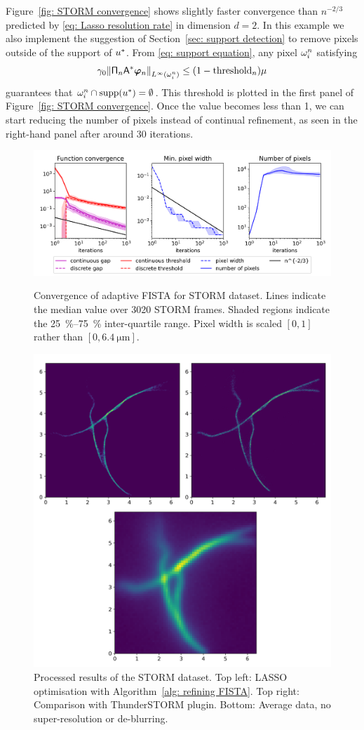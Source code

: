 \documentclass[smallextended]{svjour3}
\newcommand{\norm}[1]{{\left\lVert #1 \right\rVert}}
\newcommand{\op}[1]{\operatorname{#1}}
\newcommand{\1}{\F{1}}
\newcommand*{\varf}[1]{%
	\IfEqCase{#1}{%
		{0}{u}%
		{1}{v}%
		{2}{w}%
	}[u#1]%
}
\newcommand*{\vard}[1]{%
	\IfEqCase{#1}{%
		{0}{\varphi}%
		{1}{\psi}%
	}[\varphi #1]%
}
\newcommand*{\vars}[1]{%
	\IfEqCase{#1}{%
		{0}{\alpha}%
		{1}{\beta}%
		{2}{\gamma}%
		{3}{a}%
		{4}{b}%
		{5}{c}%
	}[k#1]%
}
\newcommand*{\vvard}[1]{\vec{\vard{#1}}}
\begin{document}
	Figure~\ref{fig: STORM convergence} shows slightly faster convergence than $n^{-2/3}$ predicted by \eqref{eq: Lasso resolution rate} in dimension $d=2$. In this example we also implement the suggestion of Section~\ref{sec: support detection} to remove pixels outside of the support of $\varf0^*$. From \eqref{eq: support equation}, any pixel $\omega_i^n$ satisfying 
	\begin{equation}
		\vars2_0 \norm{ \tens{\Pi}_n\A^*\vvard0_n }_{L^\infty(\domain_i^n)} \leq (1-\op{threshold}_n)\mu
	\end{equation}
	guarantees that $\domain_i^n\cap\op{supp}(\varf0^*) = \emptyset$. This threshold is plotted in the first panel of Figure~\ref{fig: STORM convergence}. Once the value becomes less than 1, we can start reducing the number of pixels instead of continual refinement, as seen in the right-hand panel after around 30 iterations.
	
	\begin{figure}\centering
		\includegraphics[width=.82\textwidth]{lasso2_convergence}
		\caption{Convergence of adaptive FISTA for STORM dataset. Lines indicate the median value over 3020 STORM frames. Shaded regions indicate the \SIrange{25}{75}{\percent} inter-quartile range. Pixel width is scaled $[0,1]$ rather than $[0,\SI{6.4}{\micro\meter}]$.}\label{fig: STORM convergence}
		
		\vspace*{\floatsep}
		
		\includegraphics[width=.73\textwidth]{STORM_recon}
		\caption{Processed results of the STORM dataset. Top left: LASSO optimisation with Algorithm~\ref{alg: refining FISTA}. Top right: Comparison with ThunderSTORM plugin. Bottom: Average data, no super-resolution or de-blurring.}\label{fig: STORM results}
	\end{figure}
	
\end{document}
